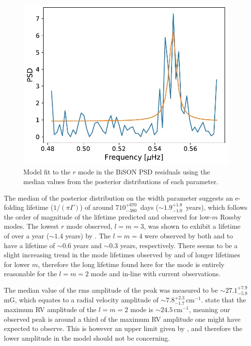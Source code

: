\begin{figure}[!ht]
	\centering
	\includegraphics[width=0.65\columnwidth]{symm_r-mode_model_fit.pdf}
	\caption{Model fit to the $r$ mode in the BiSON PSD residuals using the median values from the posterior distributions of each parameter.}  \label{fig:rmode_symm_fit}
\end{figure}

The median of the posterior distribution on the width parameter suggests an e-folding lifetime ($1/(\pi \Gamma)$) of around $710^{+670}_{-380}$~days ($\sim 1.9^{+1.8}_{-1.0}$~years), which follows the order of magnitude of the lifetime predicted and observed for low-$m$ Rossby modes. The lowest $r$ mode observed, $l=m=3$, was shown to exhibit a lifetime of over a year ($\sim 1.4$ years) by \citet{liang_time-distance_2019}. The $l=m=4$ were observed by both \citet{loptien_global-scale_2018} and \citet{liang_time-distance_2019} to have a lifetime of $\sim 0.6$ years and $\sim 0.3$ years, respectively. There seems to be a slight increasing trend in the mode lifetimes observed by \citet{loptien_global-scale_2018} and \citet{liang_time-distance_2019} of longer lifetimes for lower $m$, therefore the long lifetime found here for the mode is entirely reasonable for the $l=m=2$ mode and in-line with current observations.

The median value of the \gls{rms} amplitude of the peak was measured to be $\sim 27.1_{-5.9}^{+7.9}$ mG, which equates to a radial velocity amplitude of $\sim 7.8_{-1.7}^{+2.3} \, \mathrm{cm}^{-1}$. \citet{lanza_sectoral_2019} state that the maximum RV amplitude of the $l=m=2$ mode is $\sim 24.5 \,\mathrm{cm}^{-1}$, meaning our observed peak is around a third of the maximum RV amplitude one might have expected to observe. This is however an upper limit given by \citet{lanza_sectoral_2019}, and therefore the lower amplitude in the model should not be concerning.

